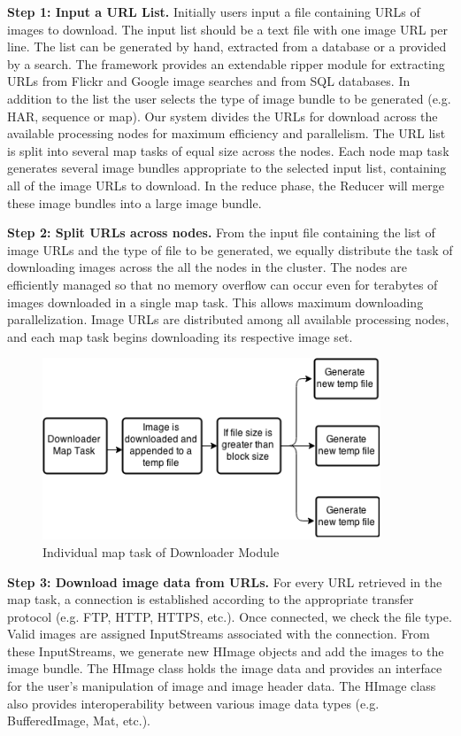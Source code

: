 \documentclass{osuthesis}
\begin{document}
				\textbf{Step 1: Input a URL List.} Initially users input a file
				containing URLs of images to download. The input list should be a text
				file with one image URL per line. The list can be generated by hand,
				extracted from a database or a provided by a search. The framework
				provides an extendable ripper module for extracting URLs from Flickr
				and Google image searches and from SQL databases. In addition to the
				list the user selects the type of image bundle to be generated
				(e.g. HAR, sequence or map).  Our system divides the URLs for download
				across the available processing nodes for maximum efficiency and
				parallelism. The URL list is split into several map tasks of equal size across the nodes. Each node map task generates several image bundles
				appropriate to the selected input list, containing all of the image URLs
				to download. In the reduce phase, the Reducer will merge these image
				bundles into a large image bundle.
				
				
				\textbf{Step 2: Split URLs across nodes.}  From the input file
				containing the list of image URLs and the type of file to be
				generated, we equally distribute the task of downloading images across
				the all the nodes in the cluster. The nodes are efficiently managed so
				that no memory overflow can occur even for terabytes of images
				downloaded in a single map task. This allows maximum downloading
				parallelization. Image URLs are distributed among all available
				processing nodes, and each map task begins downloading its respective
				image set.
				
				\begin{figure}[h]
					\centering
					\includegraphics[width=0.90\textwidth]{down-map}
					\caption{Individual map task of Downloader Module}
					\label{fig:down-map}
				\end{figure}
				
				\textbf{Step 3: Download image data from URLs.}  For every URL
				retrieved in the map task, a connection is established according to
				the appropriate transfer protocol (e.g. FTP, HTTP, HTTPS, etc.). Once
				connected, we check the file type.  Valid images are assigned
				InputStreams associated with the connection. From these InputStreams,
				we generate new HImage objects and add the images to the image
				bundle. The HImage class holds the image data and provides an
				interface for the user's manipulation of image and image header
				data. The HImage class also provides interoperability between various
				image data types (e.g. BufferedImage, Mat, etc.).
				
\end{document}
